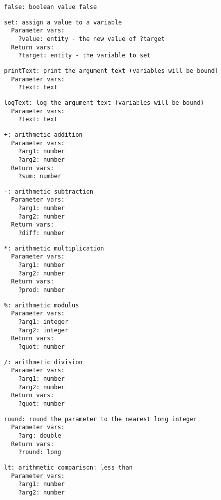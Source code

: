 \documentclass[11pt,letterpaper]{article}
\begin{document}
\begin{Verbatim}
false: boolean value false
\end{Verbatim}

\begin{Verbatim}
set: assign a value to a variable
  Parameter vars:
    ?value: entity - the new value of ?target
  Return vars:
    ?target: entity - the variable to set
\end{Verbatim}

\begin{Verbatim}
printText: print the argument text (variables will be bound)
  Parameter vars:
    ?text: text
\end{Verbatim}

\begin{Verbatim}
logText: log the argument text (variables will be bound)
  Parameter vars:
    ?text: text
\end{Verbatim}

\begin{Verbatim}
+: arithmetic addition
  Parameter vars:
    ?arg1: number
    ?arg2: number
  Return vars:
    ?sum: number
\end{Verbatim}

\begin{Verbatim}
-: arithmetic subtraction
  Parameter vars:
    ?arg1: number
    ?arg2: number
  Return vars:
    ?diff: number
\end{Verbatim}

\begin{Verbatim}
*: arithmetic multiplication
  Parameter vars:
    ?arg1: number
    ?arg2: number
  Return vars:
    ?prod: number
\end{Verbatim}

\begin{Verbatim}
%: arithmetic modulus
  Parameter vars:
    ?arg1: integer
    ?arg2: integer
  Return vars:
    ?quot: number
\end{Verbatim}

\begin{Verbatim}
/: arithmetic division
  Parameter vars:
    ?arg1: number
    ?arg2: number
  Return vars:
    ?quot: number
\end{Verbatim}

\begin{Verbatim}
round: round the parameter to the nearest long integer
  Parameter vars:
    ?arg: double
  Return vars:
    ?round: long
\end{Verbatim}

\begin{Verbatim}
lt: arithmetic comparison: less than
  Parameter vars:
    ?arg1: number
    ?arg2: number
\end{Verbatim}
\end{document}
